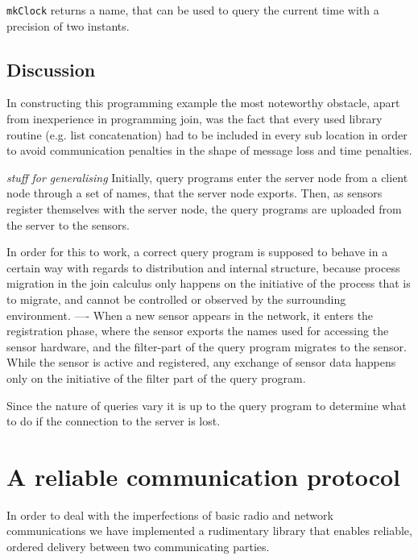 \texttt{mkClock} returns a name, that can be used to query the current time
with a precision of two instants.


\subsection*{Discussion}

In constructing this programming example the most noteworthy obstacle, apart
from inexperience in programming join, was the fact that every used library
routine (e.g. list concatenation) had to be included in every sub location in
order to avoid communication penalties in the shape of message loss and time
penalties.


\emph{stuff for generalising} Initially, query programs enter the server node
from a client node through a set of names, that the server node exports.  Then,
as sensors register themselves with the server node, the query programs are
uploaded from the server to the sensors.

In order for this to work, a correct query program is supposed to behave in a
certain way with regards to distribution and internal structure, because
process migration in the join calculus only happens on the initiative of the
process that is to migrate, and cannot be controlled or observed by the
surrounding environment.
----
When a new sensor appears in the network, it enters the registration phase,
where the sensor exports the names used for accessing the sensor hardware, and
the filter-part of the query program migrates to the sensor.  While the sensor
is active and registered, any exchange of sensor data happens only on the
initiative of the filter part of the query program.

Since the nature of queries vary it is up to the query program to determine what
to do if the connection to the server is lost.

\section{A reliable communication protocol}

 In order to deal with the imperfections of basic radio and network
communications we have implemented a rudimentary library that enables reliable,
ordered delivery between two communicating parties.

